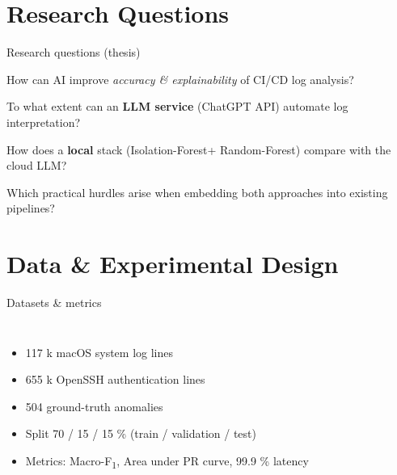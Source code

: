 \documentclass[14pt,aspectratio=169]{beamer}
\newcommand{\IForest}{Isolation-Forest\xspace}
\newcommand{\RForest}{Random-Forest\xspace}
\begin{document}
\section{Research Questions}
\begin{frame}{Research questions (thesis)}
\begin{description}[<+->]
  \item[RQ\textsubscript{main}] How can AI improve \emph{accuracy \& explainability} of CI/CD log analysis?
  \item[RQ1] To what extent can an \textbf{LLM service} (ChatGPT API) automate log interpretation?
  \item[RQ2] How does a \textbf{local} stack (\IForest + \RForest) compare with the cloud LLM?
  \item[RQ3] Which practical hurdles arise when embedding both approaches into existing pipelines?
\end{description}
\end{frame}

\section{Data \& Experimental Design}
\begin{frame}{Datasets \& metrics}
\begin{columns}
\begin{itemize}[<+->]
  \item 117 k macOS system log lines
  \item 655 k OpenSSH authentication lines
  \item 504 ground-truth anomalies
  \item Split 70 / 15 / 15 \% (train / validation / test)
  \item Metrics: Macro-F\textsubscript{1}, Area under PR curve, 99.9 \% latency
\end{itemize}

\centering
\begin{adjustbox}{max width=\linewidth}
\end{adjustbox}
\end{columns}
\end{frame}
\end{document}
